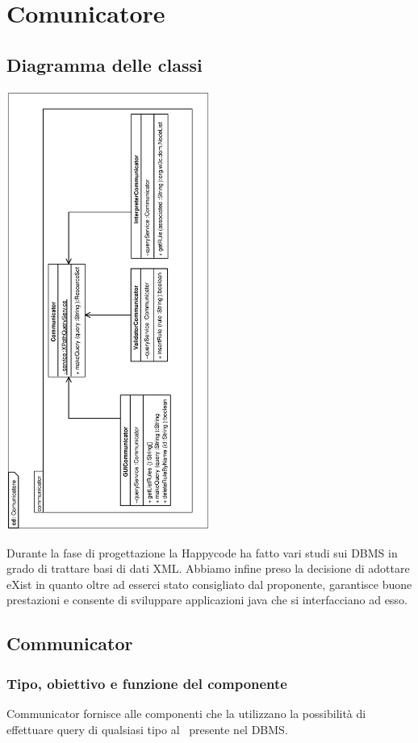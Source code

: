 \documentclass[11pt,titlepage,a4paper]{report}
\begin{document}
\section{Comunicatore}
\subsection{Diagramma delle classi}
\begin{center}
\includegraphics[width=0.5\textwidth, angle=-90]{DiagrammaClassi/Comunicatore.eps}
\end{center}
Durante la fase di progettazione la Happycode ha fatto vari studi sui DBMS in grado di trattare basi di dati XML. Abbiamo infine preso la decisione di adottare eXist in quanto oltre ad esserci stato consigliato dal proponente, garantisce buone prestazioni e consente di sviluppare applicazioni java che si interfacciano ad esso.
\subsection{Communicator}
\subsubsection{Tipo, obiettivo e funzione del componente}
Communicator fornisce alle componenti che la utilizzano la possibilit\`a di effettuare query di qualsiasi tipo al \re\ presente nel DBMS.
\end{document}
